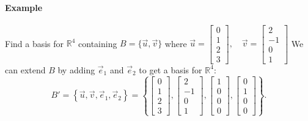 \paragraph*{Example}
Find a basis for $\mathbb{R}^4$ containing $B = \{\vec{u}, \vec{v}\}$ where $\vec{u} = \begin{bmatrix}
    0 \\
    1 \\
    2 \\
    3
\end{bmatrix}, \quad \vec{v} = \begin{bmatrix}
    2 \\
    -1 \\
    0 \\
    1
\end{bmatrix}$
We can extend $B$ by adding $\vec{e}_1$ and $\vec{e}_2$ to get a basis for $\mathbb{R}^4$:
\[
B' = \left\{ \vec{u}, \vec{v}, \vec{e}_1, \vec{e}_2 \right\} = \left\{ \begin{bmatrix}
    0 \\
    1 \\
    2 \\
    3
\end{bmatrix}, \begin{bmatrix}
    2 \\
    -1 \\
    0 \\
    1
\end{bmatrix}, \begin{bmatrix}
    1 \\
    0 \\
    0 \\
    0
\end{bmatrix}, \begin{bmatrix}
    0 \\
    1 \\
    0 \\
    0
\end{bmatrix} \right\}.
\]

